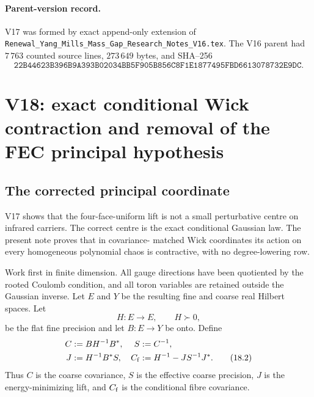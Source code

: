 \documentclass[11pt,oneside]{book}
\theoremstyle{definition}
\theoremstyle{remark}
\begin{document}
\paragraph{Parent-version record.}
V17 was formed by exact append-only extension of
\texttt{Renewal\_Yang\_Mills\_Mass\_Gap\_Research\_Notes\_V16.tex}.
The V16 parent had \(7\,763\) counted source lines,
\(273\,649\) bytes, and SHA--256
\[
\texttt{22B44623B396B9A393B02034BB5F905B856C8F1E1877495FBD6613078732E9DC}.
\]



\section{V18: exact conditional Wick contraction and removal of the FEC
principal hypothesis}
\label{sec:e8v18}

\subsection{The corrected principal coordinate}

V17 shows that the four-face-uniform lift is not a small perturbative
centre on infrared carriers.  The correct centre is the exact
conditional Gaussian law.  The present note proves that in covariance-
matched Wick coordinates its action on every homogeneous polynomial
chaos is contractive, with no degree-lowering row.

Work first in finite dimension.  All gauge directions have been
quotiented by the rooted Coulomb condition, and all toron variables are
retained outside the Gaussian inverse.  Let \(E\) and \(Y\) be the
resulting fine and coarse real Hilbert spaces.  Let
\[
 H:E\longrightarrow E,\qquad H\succ0,                              \tag{18.1}
\]
be the flat fine precision and let \(B:E\to Y\) be onto.  Define
\[
\begin{split}
 C&:=BH^{-1}B^*,&
 S&:=C^{-1},\\
 J&:=H^{-1}B^*S,&
 C_{\rm f}&:=H^{-1}-JS^{-1}J^* .                                  \tag{18.2}
\end{split}
\]
Thus \(C\) is the coarse covariance, \(S\) is the effective coarse
precision, \(J\) is the energy-minimizing lift, and \(C_{\rm f}\) is
the conditional fibre covariance.
\end{document}
